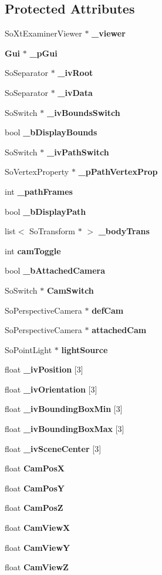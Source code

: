 \subsection*{Protected Attributes}
\begin{CompactItemize}
\item 
So\-Xt\-Examiner\-Viewer $\ast$ {\bf \_\-viewer}
\item 
{\bf Gui} $\ast$ {\bf \_\-p\-Gui}
\item 
So\-Separator $\ast$ {\bf \_\-iv\-Root}
\item 
So\-Separator $\ast$ {\bf \_\-iv\-Data}
\item 
So\-Switch $\ast$ {\bf \_\-iv\-Bounds\-Switch}
\item 
bool {\bf \_\-b\-Display\-Bounds}
\item 
So\-Switch $\ast$ {\bf \_\-iv\-Path\-Switch}
\item 
So\-Vertex\-Property $\ast$ {\bf \_\-p\-Path\-Vertex\-Prop}
\item 
int {\bf \_\-path\-Frames}
\item 
bool {\bf \_\-b\-Display\-Path}
\item 
list$<$ So\-Transform $\ast$ $>$ {\bf \_\-body\-Trans}
\item 
int {\bf cam\-Toggle}
\item 
bool {\bf \_\-b\-Attached\-Camera}
\item 
So\-Switch $\ast$ {\bf Cam\-Switch}
\item 
So\-Perspective\-Camera $\ast$ {\bf def\-Cam}
\item 
So\-Perspective\-Camera $\ast$ {\bf attached\-Cam}
\item 
So\-Point\-Light $\ast$ {\bf light\-Source}
\item 
float {\bf \_\-iv\-Position} [3]
\item 
float {\bf \_\-iv\-Orientation} [3]
\item 
float {\bf \_\-iv\-Bounding\-Box\-Min} [3]
\item 
float {\bf \_\-iv\-Bounding\-Box\-Max} [3]
\item 
float {\bf \_\-iv\-Scene\-Center} [3]
\item 
float {\bf Cam\-Pos\-X}
\item 
float {\bf Cam\-Pos\-Y}
\item 
float {\bf Cam\-Pos\-Z}
\item 
float {\bf Cam\-View\-X}
\item 
float {\bf Cam\-View\-Y}
\item 
float {\bf Cam\-View\-Z}

\end{CompactItemize}
